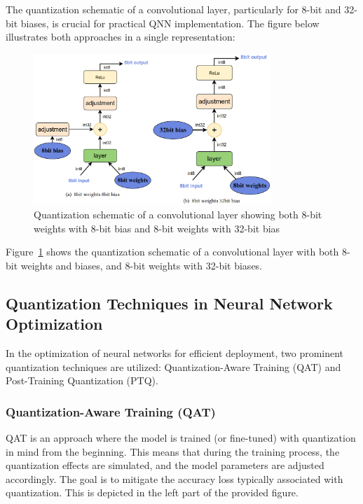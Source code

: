 \documentclass[10pt]{article}
\begin{document}
The quantization schematic of a convolutional layer, particularly for 8-bit and 32-bit biases, is crucial for practical QNN implementation. The figure below illustrates both approaches in a single representation:

\begin{figure}[H]
\centering
\includegraphics[width=0.8\textwidth]{figures/quant_schem_conv_layer.png}
\caption{Quantization schematic of a convolutional layer showing both 8-bit weights with 8-bit bias and 8-bit weights with 32-bit bias}
\label{fig:convolutional_layer_combined}
\end{figure}

Figure~\ref{fig:convolutional_layer_combined} shows the quantization schematic of a convolutional layer with both 8-bit weights and biases, and 8-bit weights with 32-bit biases.


\subsection{Quantization Techniques in Neural Network Optimization}

In the optimization of neural networks for efficient deployment, two prominent quantization techniques are utilized: Quantization-Aware Training (QAT) and Post-Training Quantization (PTQ). 

\subsubsection{Quantization-Aware Training (QAT)}
QAT is an approach where the model is trained (or fine-tuned) with quantization in mind from the beginning. This means that during the training process, the quantization effects are simulated, and the model parameters are adjusted accordingly. The goal is to mitigate the accuracy loss typically associated with quantization. This is depicted in the left part of the provided figure.
\end{document}
